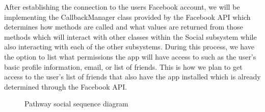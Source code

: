 \documentclass{article}
\begin{document}
After establishing the connection to the users Facebook account, we will be implementing the CallbackManager class provided by the Facebook API which determines how methods are called and what values are returned from those methods which will interact with other classes within the Social subsystem while also interacting with each of the other subsystems. During this process, we have the option to list what permissions the app will have access to such as the user's basic profile information, email, or list of friends. This is how we plan to get access to the user's list of friends that also have the app installed which is already determined through the Facebook API.

\begin{figure}[H]
      \centering
      \begin{center}
        \end{center}
      \caption{Pathway social sequence diagram}
      \label{fig:my_label}
  \end{figure}
\end{document}
